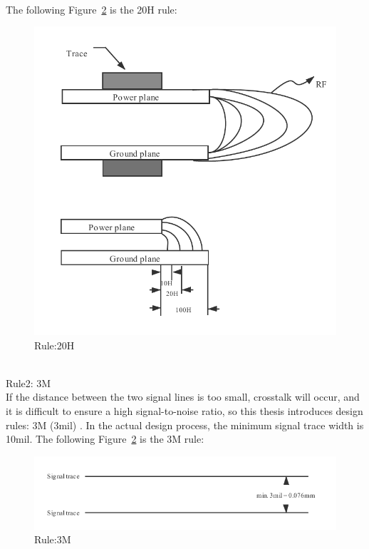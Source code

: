 \\
The following Figure~\ref{fig:6.13} is the 20H rule:
 
\begin{figure}[!ht]
	\centering
	\includegraphics[width=15cm]{grafiken/6.12.pdf}
	\caption{Rule:20H} 
	\label{fig:6.12}
\end{figure}
\FloatBarrier
\\

Rule2: 3M
\\
If the distance between the two signal lines is too small, crosstalk will occur, and it is difficult to ensure a high signal-to-noise ratio, so this thesis introduces design rules: 3M (3mil) \cite{shan2010layer}. In the actual design process, the minimum signal trace width is 10mil.
The following Figure~\ref{fig:6.13} is the 3M rule:

\begin{figure}[!ht]
	\centering
	\includegraphics[width=16cm]{grafiken/6.13.pdf}
	\caption{Rule:3M} 
	\label{fig:6.13}
\end{figure}
\FloatBarrier
\\

